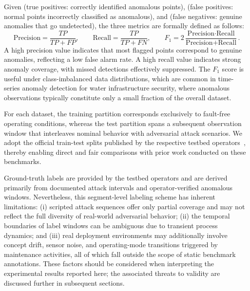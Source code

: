 \documentclass[pdflatex,sn-mathphys-num]{sn-jnl}
\theoremstyle{thmstyleone}
\theoremstyle{thmstyletwo}
\theoremstyle{thmstylethree}
\begin{document}
Given  (true positives: correctly identified anomalous points),  (false positives: normal points incorrectly classified as anomalous), and (false negatives: genuine anomalies that go undetected), the three metrics are formally defined as follows:
\begin{equation}
\text{Precision} = \frac{TP}{TP+FP}, \qquad \text{Recall} = \frac{TP}{TP+FN},\qquad F_1 = 2\frac{\text{Precision}\cdot \text{Recall}}{\text{Precision}+\text{Recall}}.
\end{equation}
A high precision value indicates that most flagged points correspond to genuine anomalies, reflecting a low false alarm rate. A high recall value indicates strong anomaly coverage, with missed detections effectively suppressed. The $F_1$ score is useful under class-imbalanced data distributions, which are common in time-series anomaly detection for water infrastructure security, where anomalous observations typically constitute only a small fraction of the overall dataset.

For each dataset, the training partition corresponds exclusively to fault-free operating conditions, whereas the test partition spans a subsequent observation window that interleaves nominal behavior with adversarial attack scenarios. We adopt the official train-test splits published by the respective testbed operators~\cite{ahmed2017wadi, mathur2016swat}, thereby enabling direct and fair comparisons with prior work conducted on these benchmarks. 

Ground-truth labels are provided by the testbed operators and are derived primarily from documented attack intervals and operator-verified anomalous windows. Nevertheless, this segment-level labeling scheme has inherent limitations: 
(i) scripted attack sequences offer only partial coverage and may not reflect the full diversity of real-world adversarial behavior; 
(ii) the temporal boundaries of label windows can be ambiguous due to transient process dynamics; and 
(iii) real deployment environments may additionally involve concept drift, sensor noise, and operating-mode transitions triggered by maintenance activities, all of which fall outside the scope of static benchmark annotations.
These factors should be considered when interpreting the experimental results reported here; the associated threats to validity are discussed further in subsequent sections.
\end{document}
